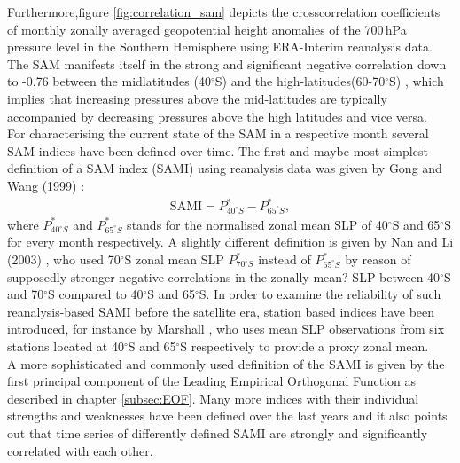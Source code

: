 	Furthermore,figure \ref{fig:correlation_sam} depicts the crosscorrelation coefficients of monthly zonally averaged geopotential height anomalies of the 700\,hPa pressure level in the Southern Hemisphere using ERA-Interim reanalysis data. The SAM manifests itself in the strong and significant negative correlation down to -0.76 between the midlatitudes (40$^\circ$S) and the high-latitudes(60-70$^\circ$S) \cite{Gong1999}, which implies that increasing pressures above the mid-latitudes are typically accompanied by decreasing pressures above the high latitudes and vice versa.\\
	For characterising the current state of the SAM in a respective month several SAM-indices have been defined over time. The first and maybe most simplest definition of a SAM index (SAMI) using reanalysis data was given by Gong and Wang (1999) \cite{Gong1999}:
	\begin{align}\label{eq:Gong}
		\text{SAMI}=P^{*}_{40^\circ S}-P^{*}_{65^\circ S},
	\end{align}
where $P^{*}_{40^\circ S}$ and $P^{*}_{65^\circ S}$ stands for the normalised zonal mean SLP of 40$^\circ$S and 65$^\circ$S for every month respectively. A slightly different definition is given by Nan and Li (2003) \cite{Nan2003}, who used 70$^\circ$S zonal mean SLP  $P^{*}_{70^\circ S}$ instead of  $P^{*}_{65^\circ S}$ by reason of supposedly stronger negative correlations in the zonally-mean? SLP between 40$^\circ$S and 70$^\circ$S compared to 40$^\circ$S and 65$^\circ$S. In order to examine the reliability of such reanalysis-based SAMI before the satellite era, station based indices have been introduced, for instance by  Marshall \cite{Marshall2003}, who uses mean SLP observations from six stations located at 40$^\circ$S and 65$^\circ$S respectively to provide a proxy zonal mean.\\
A more sophisticated and commonly used definition of the SAMI is given by the first principal component of the Leading Empirical Orthogonal Function as described in chapter \ref{subsec:EOF}. Many more indices with their individual strengths and weaknesses have been defined over the last years and it also points out that time series of differently defined SAMI are strongly and significantly correlated with each other.\cite{Ho2012a}\\

